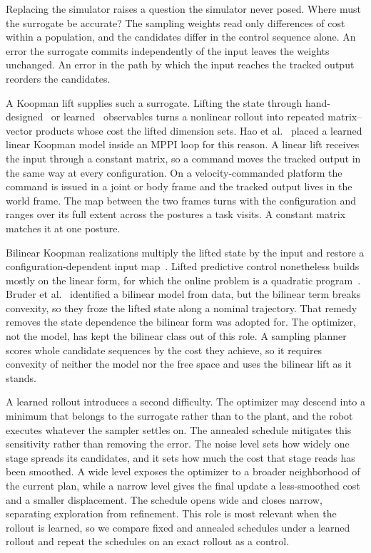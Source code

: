 \documentclass[letterpaper,10pt,conference]{ieeeconf}
\begin{document}
Replacing the simulator raises a question the simulator never posed.
Where must the surrogate be accurate?
The sampling weights read only differences of cost within a population, and the candidates differ in the control sequence alone.
An error the surrogate commits independently of the input leaves the weights unchanged.
An error in the path by which the input reaches the tracked output reorders the candidates.

A Koopman lift supplies such a surrogate.
Lifting the state through hand-designed~\cite{williams2015edmd, proctor2016dmdc} or learned~\cite{lusch2018deep} observables turns a nonlinear rollout into repeated matrix--vector products whose cost the lifted dimension sets.
Hao et al.~\cite{mppidk2026} placed a learned linear Koopman model inside an MPPI loop for this reason.
A linear lift receives the input through a constant matrix, so a command moves the tracked output in the same way at every configuration.
On a velocity-commanded platform the command is issued in a joint or body frame and the tracked output lives in the world frame.
The map between the two frames turns with the configuration and ranges over its full extent across the postures a task visits.
A constant matrix matches it at one posture.

Bilinear Koopman realizations multiply the lifted state by the input and restore a configuration-dependent input map~\cite{iacob2024}.
Lifted predictive control nonetheless builds mostly on the linear form, for which the online problem is a quadratic program~\cite{korda2018mpc}.
Bruder et al.~\cite{bruder2021bilinear} identified a bilinear model from data, but the bilinear term breaks convexity, so they froze the lifted state along a nominal trajectory.
That remedy removes the state dependence the bilinear form was adopted for.
The optimizer, not the model, has kept the bilinear class out of this role.
A sampling planner scores whole candidate sequences by the cost they achieve, so it requires convexity of neither the model nor the free space and uses the bilinear lift as it stands.

A learned rollout introduces a second difficulty.
The optimizer may descend into a minimum that belongs to the surrogate rather than to the plant, and the robot executes whatever the sampler settles on.
The annealed schedule mitigates this sensitivity rather than removing the error.
The noise level sets how widely one stage spreads its candidates, and it sets how much the cost that stage reads has been smoothed.
A wide level exposes the optimizer to a broader neighborhood of the current plan, while a narrow level gives the final update a less-smoothed cost and a smaller displacement.
The schedule opens wide and closes narrow, separating exploration from refinement.
This role is most relevant when the rollout is learned, so we compare fixed and annealed schedules under a learned rollout and repeat the schedules on an exact rollout as a control.
\end{document}
